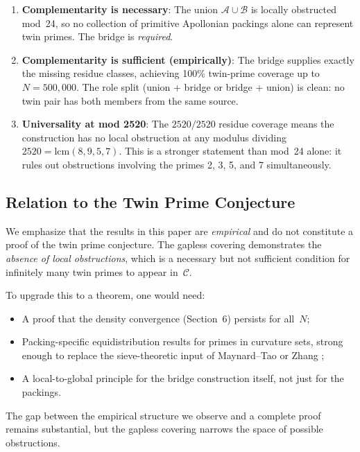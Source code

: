 \documentclass[12pt,a4paper]{article}
\theoremstyle{remark}
\begin{document}
\begin{enumerate}
\item \textbf{Complementarity is necessary}: The union
$\mathcal{A} \cup \mathcal{B}$ is locally obstructed mod~24, so no
collection of primitive Apollonian packings alone can represent twin
primes. The bridge is \emph{required}.

\item \textbf{Complementarity is sufficient (empirically)}: The bridge
supplies exactly the missing residue classes, achieving 100\% twin-prime
coverage up to $N = 500{,}000$. The role split
(union + bridge or bridge + union) is clean: no twin pair has both
members from the same source.

\item \textbf{Universality at mod 2520}: The $2520/2520$ residue coverage
means the construction has no local obstruction at any modulus dividing
$2520 = \text{lcm}(8,9,5,7)$. This is a stronger statement than mod~24
alone: it rules out obstructions involving the primes 2, 3, 5, and 7
simultaneously.
\end{enumerate}

\subsection{Relation to the Twin Prime Conjecture}

We emphasize that the results in this paper are \emph{empirical} and do
not constitute a proof of the twin prime conjecture. The gapless covering
demonstrates the \emph{absence of local obstructions}, which is a
necessary but not sufficient condition for infinitely many twin primes
to appear in~$\mathcal{C}$.

To upgrade this to a theorem, one would need:
\begin{itemize}
\item A proof that the density convergence
(Section~6) persists for all~$N$;
\item Packing-specific equidistribution results for primes in curvature
sets, strong enough to replace the sieve-theoretic input of
Maynard--Tao \cite{Maynard2015} or Zhang \cite{Zhang2014};
\item A local-to-global principle for the bridge construction itself,
not just for the packings.
\end{itemize}

The gap between the empirical structure we observe and a complete proof
remains substantial, but the gapless covering narrows the space of
possible obstructions.
\end{document}
